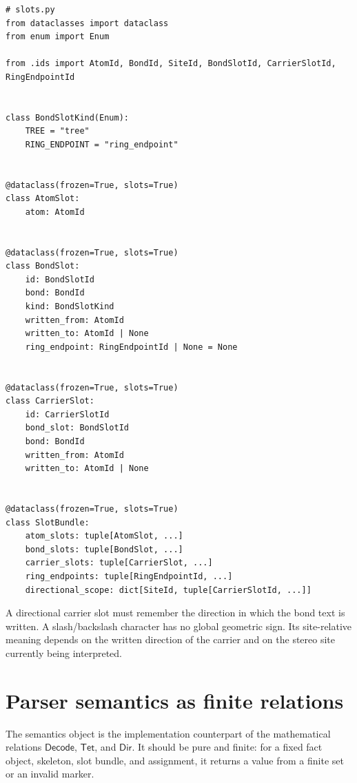 \documentclass[10pt,a4paper]{article}
\newcommand{\Decode}{\mathsf{Decode}}
\newcommand{\Tet}{\mathsf{Tet}}
\newcommand{\Dir}{\mathsf{Dir}}
\theoremstyle{definition}
\theoremstyle{remark}
\begin{document}
\begin{lstlisting}
# slots.py
from dataclasses import dataclass
from enum import Enum

from .ids import AtomId, BondId, SiteId, BondSlotId, CarrierSlotId, RingEndpointId


class BondSlotKind(Enum):
    TREE = "tree"
    RING_ENDPOINT = "ring_endpoint"


@dataclass(frozen=True, slots=True)
class AtomSlot:
    atom: AtomId


@dataclass(frozen=True, slots=True)
class BondSlot:
    id: BondSlotId
    bond: BondId
    kind: BondSlotKind
    written_from: AtomId
    written_to: AtomId | None
    ring_endpoint: RingEndpointId | None = None


@dataclass(frozen=True, slots=True)
class CarrierSlot:
    id: CarrierSlotId
    bond_slot: BondSlotId
    bond: BondId
    written_from: AtomId
    written_to: AtomId | None


@dataclass(frozen=True, slots=True)
class SlotBundle:
    atom_slots: tuple[AtomSlot, ...]
    bond_slots: tuple[BondSlot, ...]
    carrier_slots: tuple[CarrierSlot, ...]
    ring_endpoints: tuple[RingEndpointId, ...]
    directional_scope: dict[SiteId, tuple[CarrierSlotId, ...]]
\end{lstlisting}

A directional carrier slot must remember the direction in which the bond text is
written.  A slash/backslash character has no global geometric sign.  Its
site-relative meaning depends on the written direction of the carrier and on the
stereo site currently being interpreted.

\section{Parser semantics as finite relations}
\label{s:semantics}

The semantics object is the implementation counterpart of the mathematical
relations \(\Decode\), \(\Tet\), and \(\Dir\).  It should be pure and finite:
for a fixed fact object, skeleton, slot bundle, and assignment, it returns a
value from a finite set or an invalid marker.
\end{document}
